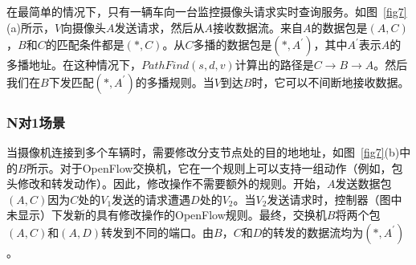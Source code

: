 在最简单的情况下，只有一辆车向一台监控摄像头请求实时查询服务。如图~\ref{fig7}(a)所示，$V$向摄像头$A$发送请求，然后从$A$接收数据流。来自$A$的数据包是$(A,C)$，$B$和$C$的匹配条件都是$(*,C)$。从$C$多播的数据包是$(*, A^{'})$，其中$A^{'}$表示$A$的多播地址。在这种情况下，$PathFind(s,d,v)$计算出的路径是$C \to B \to A$。然后我们在$B$下发匹配$(*,A^{'})$的多播规则。当$V$到达$B$时，它可以不间断地接收数据。
%


\subsubsection{N对1场景} \label{N to 1}

当摄像机连接到多个车辆时，需要修改分支节点处的目的地地址，如图~\ref{fig7}(b)中的$B$所示。对于OpenFlow交换机，它在一个规则上可以支持一组动作（例如，包头修改和转发动作）。因此，修改操作不需要额外的规则。开始，$A$发送数据包$(A, C)$因为$C$处的$V_{1}$发送的请求遭遇$D$处的$V_{2}$。当$V_{2}$发送请求时，控制器（图中未显示）下发新的具有修改操作的OpenFlow规则。最终，交换机$B$将两个包$(A, C)$和$(A, D)$转发到不同的端口。由$B$，$C$和$D$的转发的数据流均为$(*, A^{'})$。





